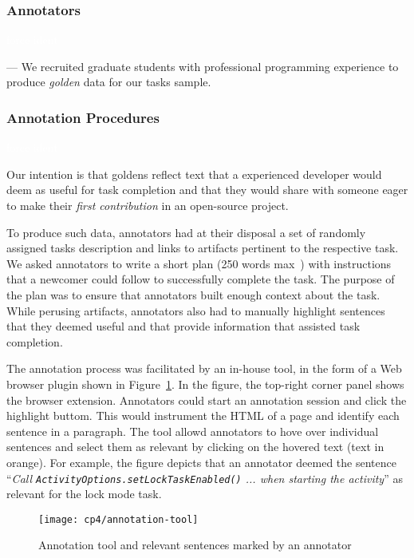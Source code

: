 \subsubsection{Annotators}
\textcolor{white}{force ident} %

--- We recruited  graduate students with professional programming experience to produce \textit{golden} data for our tasks sample. \vspace{3mm}


\subsubsection{Annotation Procedures}
\textcolor{white}{force ident} %

Our intention is that goldens reflect text that a experienced developer would deem as useful for task completion and that they would share with someone eager to make their \textit{first contribution} in an open-source project.


To produce such data, annotators had  at their disposal a set of randomly assigned tasks description and links to artifacts pertinent to the respective task. We asked annotators to write a short plan (250 words max~\cite{Rastkar2010}) with instructions that a newcomer could follow to successfully complete the task. 
The purpose of the plan was to ensure that annotators built enough context about the task.
While perusing artifacts, annotators also had to manually highlight sentences that they deemed useful and that provide information that assisted task completion. 


The annotation process was facilitated by an in-house tool, in the form of a Web browser plugin shown in Figure~\ref{fig:corpus-annotation-tool}. In the figure, the top-right corner panel shows the browser extension. Annotators could start an annotation session and click the highlight buttom.
This would instrument the HTML of a page and identify each sentence in a paragraph. The tool allowd annotators to hove over individual sentences and select them as relevant by clicking on the hovered text (text in orange). For example, the figure depicts that an annotator deemed the sentence
``\textit{Call {\small \texttt{ActivityOptions.setLockTaskEnabled()}} ... when starting the activity}'' as relevant for the lock mode task.


\begin{figure}
    \centering
    \texttt{[image: cp4/annotation-tool]}
    \caption{Annotation tool and relevant sentences marked by an annotator}
    \label{fig:corpus-annotation-tool}
\end{figure}



